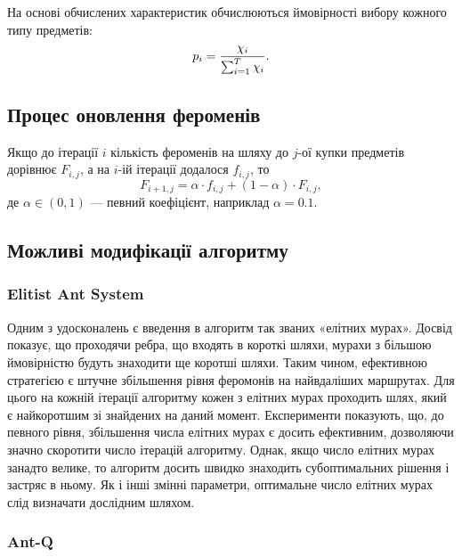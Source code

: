 \documentclass[a4paper, 12pt]{article}
\numberwithin{equation}{section}
\begin{document}
На основі обчислених характеристик обчислюються ймовірності вибору кожного типу предметів:
\begin{equation}
    p_i = \frac{\chi_i}{\operatorname*{\sum}_{i = 1}^T \chi_i}.
\end{equation}

\subsection{Процес оновлення фероменів}

Якщо до ітерації $i$ кількість фероменів на шляху до $j$-ої купки предметів дорівнює $F_{i,j}$, а на $i$-ій ітерації додалося $f_{i,j}$, то
\begin{equation}
    F_{i+1,j} = \alpha \cdot f_{i, j} + (1 - \alpha) \cdot F_{i, j},
\end{equation}
де $\alpha \in (0, 1)$ --- певний коефіцієнт, наприклад $\alpha = 0.1$.

\subsection{Можливі модифікації алгоритму}

\subsubsection{Elitist Ant System}

Одним з удосконалень є введення в алгоритм так званих «елітних мурах». Досвід показує, що проходячи ребра, що входять в короткі шляхи, мурахи з більшою ймовірністю будуть знаходити ще коротші шляхи. Таким чином, ефективною стратегією є штучне збільшення рівня феромонів на найвдаліших маршрутах. Для цього на кожній ітерації алгоритму кожен з елітних мурах проходить шлях, який є найкоротшим зі знайдених на даний момент.
Експерименти показують, що, до певного рівня, збільшення числа елітних мурах є досить ефективним, дозволяючи значно скоротити число ітерацій алгоритму. Однак, якщо число елітних мурах занадто велике, то алгоритм досить швидко знаходить субоптимальних рішення і застряє в ньому. Як і інші змінні параметри, оптимальне число елітних мурах слід визначати дослідним шляхом.

\subsubsection{Ant-Q}
\end{document}
